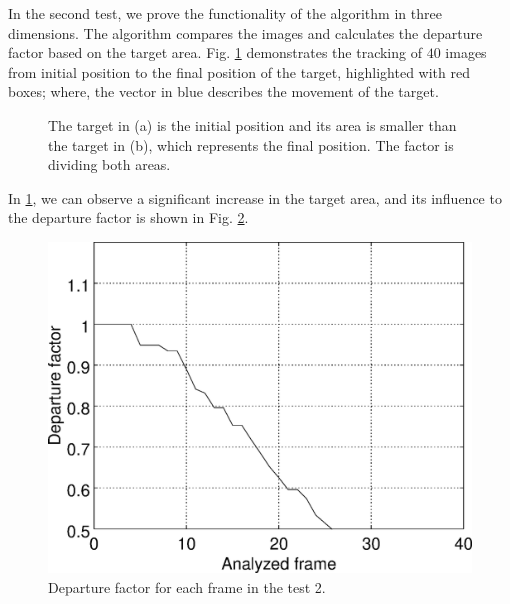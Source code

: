 In the second test, we prove the functionality of the algorithm in three dimensions. 
The algorithm compares the images and calculates the departure factor 
based on the target area. Fig. \ref{fig:target} demonstrates the 
tracking of $40$ images from initial position to the final position of the target, 
highlighted with red boxes;
where, the vector in blue describes the movement of the target. 
\begin{figure}[!hbt]
\centering
  \caption{The target in (a) is the initial position and its area is smaller than the target in (b), 
  which represents the final position. The factor is dividing both areas.}
  \label{fig:target}
\end{figure}

In \ref{fig:target}, we can observe a significant increase in the target area, and 
its influence to the departure factor is shown in Fig. \ref{fig:res_grapha_b}.

\begin{figure}[!hbt]
\includegraphics[width=\columnwidth]{images/grapha_b.eps}
\caption{Departure factor for each frame in the test 2.}
\label{fig:res_grapha_b}
\end{figure}

